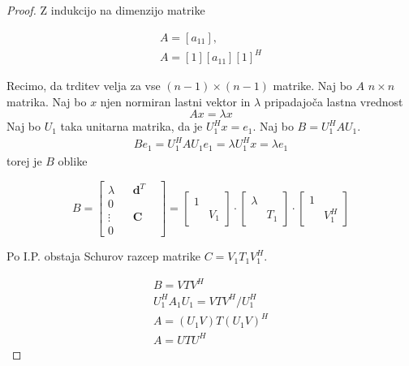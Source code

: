 \documentclass[a4paper,12pt]{article}
\theoremstyle{definition}
\theoremstyle{remark}
\begin{document}
\begin{proof}
    Z indukcijo na dimenzijo matrike

    \begin{gather*}
        A = [a_{11}], \\
        A = [1] [a_{11}] [1]^H
    \end{gather*}
    
    Recimo, da trditev velja za vse $(n-1)\times(n-1)$ matrike. Naj bo $A$ $n\times n$ matrika. Naj bo $x$ njen normiran lastni vektor in $\lambda$
    pripadajoča lastna vrednost
    \begin{equation*}
        Ax = \lambda x
    \end{equation*}
    Naj bo $U_1$ taka unitarna matrika, da je $U_1^H x = e_1$. Naj bo $B = U_1^H A U_1$.
    \begin{gather*}
        B e_1 = U_1^H A U_1 e_1 = \lambda U_1^H x = \lambda e_1
    \end{gather*}
    torej je $B$ oblike
    \begin{center}
        \begin{equation*}
            B = 
            \begin{bmatrix}
                \lambda &  & \mathbf{d}^T & \\
                0 & & & \\
                \vdots & & \mathbf{C} & \\
                0 & & &
            \end{bmatrix} = \begin{bmatrix}
                1 &  \\
                 & V_1
                \end{bmatrix} \cdot \begin{bmatrix}
                    \lambda &  \\
                     & T_1
                    \end{bmatrix} \cdot \begin{bmatrix}
                        1 &  \\
                         & V_1^H
                        \end{bmatrix}
        \end{equation*}
    \end{center}

    Po I.P. obstaja Schurov razcep matrike $C = V_1 T_1 V_1^H$.

    \begin{gather*}
        B = V T V^H \\
        U_1^H A_1 U_1 = V T V^H /U_1^H \\
        A = (U_1 V) T (U_1 V)^H \\
        A = U T U^H
    \end{gather*}
\end{proof}
\end{document}
